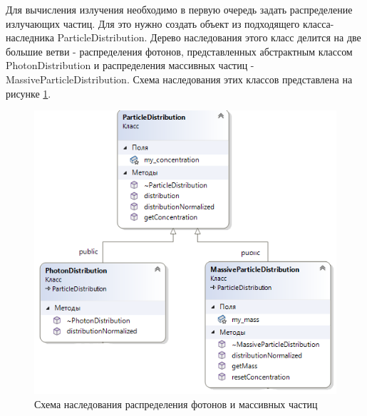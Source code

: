 Для вычисления излучения необходимо в первую очередь задать распределение излучающих частиц. Для это нужно создать объект из подходящего класса-наследника ParticleDistribution. Дерево наследования этого класс делится на две большие ветви - распределения фотонов, представленных абстрактным классом PhotonDistribution и распределения массивных частиц - MassiveParticleDistribution. Схема наследования этих классов представлена на рисунке \ref{particleDistribution0}. 

\begin{figure}
	\centering
	\includegraphics[width=8.5 cm]{./fig/particleDistribution0.png} 
	\caption{Схема наследования распределения фотонов и массивных частиц}
	\label{particleDistribution0}
\end{figure}


